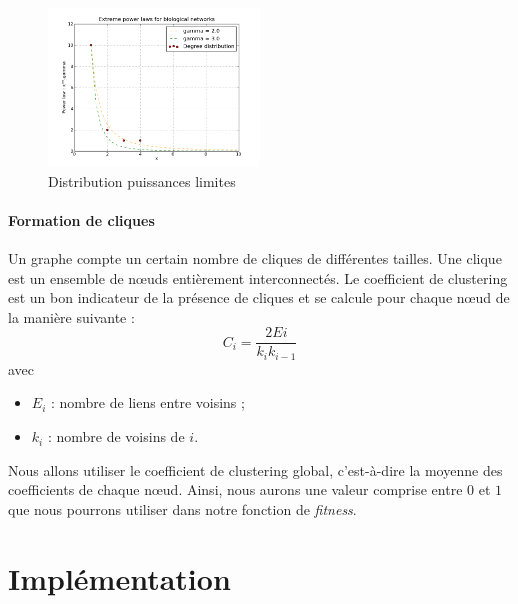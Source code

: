 \begin{figure}
  \vspace{-30pt}
  \begin{center}
    \includegraphics[width=0.50\textwidth]{plot.png}
  \end{center}
  \caption{Distribution puissances limites}
  \label{scalefree}
\end{figure}
\paragraph*{Formation de cliques\\}

Un graphe compte un certain nombre de cliques de différentes tailles. Une clique est un ensemble de nœuds entièrement interconnectés. Le coefficient de clustering est un bon indicateur de la présence de cliques et se calcule pour chaque nœud de la manière suivante :
$$ C_i = \frac{2Ei}{k_i k_{i-1}} $$
avec
\begin{itemize}
 \item $E_i$ : nombre de liens entre voisins ;
 \item $k_i$ : nombre de voisins de $i$.
\end{itemize}
Nous allons utiliser le coefficient de clustering global, c'est-à-dire la moyenne des coefficients de chaque nœud. Ainsi, nous aurons une valeur comprise entre $0$ et $1$ que nous pourrons utiliser dans notre fonction de \textit{fitness}.


\section{Implémentation}

